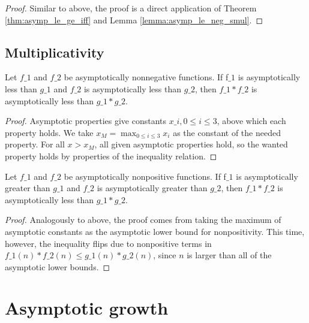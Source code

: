 \begin{proof}
    \leanok
    Similar to above, the proof is a direct application of Theorem \ref{thm:asymp_le_ge_iff}
    and Lemma \ref{lemma:asymp_le_neg_smul}.
\end{proof}


\subsection{Multiplicativity}

\begin{theorem}
    \label{thm:asymp_le_nonneg_mul}
    \leanok
    Let $f\_1$ and $f\_2$ be asymptotically nonnegative functions. If f$\_1$ is asymptotically
    less than $g\_1$ and $f\_2$ is asymptotically less than $g\_2$, then $f\_1 * f\_2$
    is asymptotically less than $g\_1 * g\_2$.
\end{theorem}

\begin{proof}
    \leanok
    Asymptotic properties give constants $x\_i, 0 \le i \le 3$, above which each property holds.
    We take $x_M = \max_{0 \le i \le 3} x_i$ as the constant of the needed property. 
    For all $x > x_M$, all given asymptotic properties hold, so the wanted property holds
    by properties of the inequality relation.
\end{proof}

\begin{theorem}
    \label{thm:asymp_ge_nonpos_mul}
    \leanok
    Let $f\_1$ and $f\_2$ be asymptotically nonpositive functions. If f$\_1$ is asymptotically
    greater than $g\_1$ and $f\_2$ is asymptotically greater than $g\_2$, then $f\_1 * f\_2$
    is asymptotically less than $g\_1 * g\_2$.
\end{theorem}

\begin{proof}
    \leanok
    Analogously to above, the proof comes from taking the maximum of asymptotic constants 
    as the asymptotic lower bound for nonpositivity. This time, however, the inequality
    flips due to nonpositive terms in $f\_1(n) * f\_2(n) \le g\_1(n) * g\_2(n)$, since 
    $n$ is larger than all of the asymptotic lower bounds.
\end{proof}


\section{Asymptotic growth}

